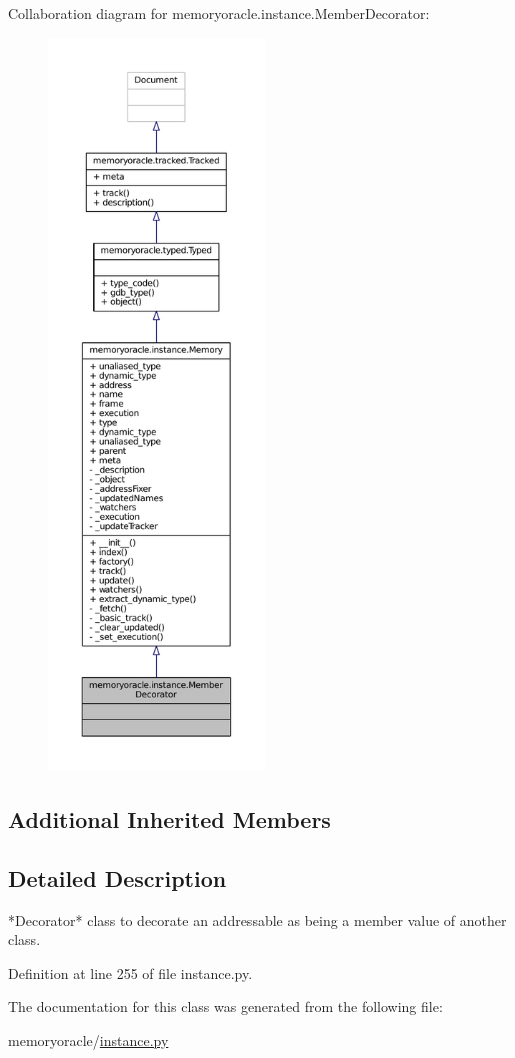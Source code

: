 Collaboration diagram for memoryoracle.\+instance.\+Member\+Decorator\+:
\nopagebreak
\begin{figure}[H]
\begin{center}
\leavevmode
\includegraphics[height=550pt]{classmemoryoracle_1_1instance_1_1MemberDecorator__coll__graph}
\end{center}
\end{figure}
\subsection*{Additional Inherited Members}


\subsection{Detailed Description}
\begin{DoxyVerb}*Decorator* class to decorate an addressable as being a member value
of another class.
\end{DoxyVerb}
 

Definition at line 255 of file instance.\+py.



The documentation for this class was generated from the following file\+:\begin{DoxyCompactItemize}
\item 
memoryoracle/\hyperlink{instance_8py}{instance.\+py}\end{DoxyCompactItemize}
